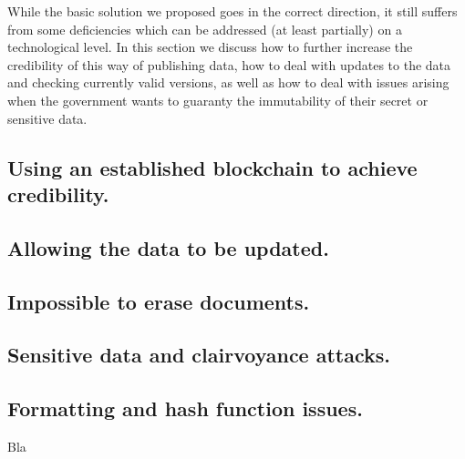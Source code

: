 While the basic solution we proposed goes in the correct direction, it still suffers from some deficiencies which can be addressed (at least partially) on a technological level. In this section we discuss how to further increase the credibility of this way of publishing data, how to deal with updates to the data and checking currently valid versions, as well as how to deal with issues arising when the government wants to guaranty the immutability of their secret or sensitive data.

\subsection{Using an established blockchain to achieve credibility.}



\subsection{Allowing the data to be updated.}



\subsection{Impossible to erase documents.}



\subsection{Sensitive data and clairvoyance attacks.}



\subsection{Formatting and hash function issues.}


Bla